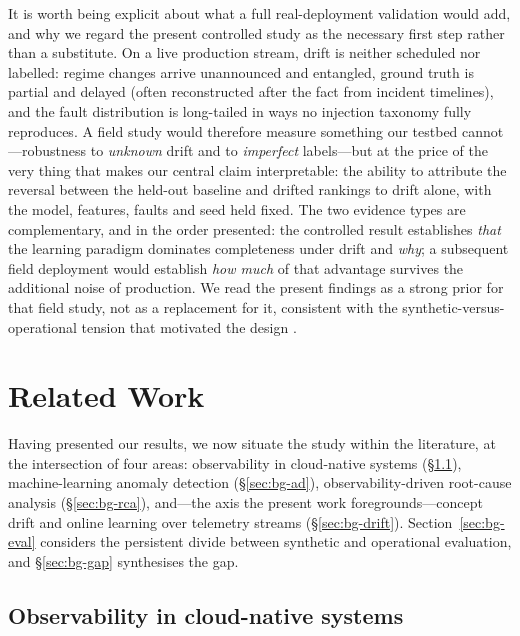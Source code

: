 \documentclass[pdflatex,sn-mathphys-num]{sn-jnl}%
\theoremstyle{thmstyleone}%
\theoremstyle{thmstyletwo}%
\theoremstyle{thmstylethree}%
\begin{document}
It is worth being explicit about what a full real-deployment validation would add, and why we regard the present controlled study as the necessary first step rather than a substitute. On a live production stream, drift is neither scheduled nor labelled: regime changes arrive unannounced and entangled, ground truth is partial and delayed (often reconstructed after the fact from incident timelines), and the fault distribution is long-tailed in ways no injection taxonomy fully reproduces. A field study would therefore measure something our testbed cannot---robustness to \emph{unknown} drift and to \emph{imperfect} labels---but at the price of the very thing that makes our central claim interpretable: the ability to attribute the reversal between the held-out baseline and drifted rankings to drift alone, with the model, features, faults and seed held fixed. The two evidence types are complementary, and in the order presented: the controlled result establishes \emph{that} the learning paradigm dominates completeness under drift and \emph{why}; a subsequent field deployment would establish \emph{how much} of that advantage survives the additional noise of production. We read the present findings as a strong prior for that field study, not as a replacement for it, consistent with the synthetic-versus-operational tension that motivated the design \cite{hrusto2026,islam2021}.

\section{Related Work}\label{sec:background}

Having presented our results, we now situate the study within the literature, at the intersection of four areas: observability in cloud-native systems (\S\ref{sec:bg-obs}), machine-learning anomaly detection (\S\ref{sec:bg-ad}), observability-driven root-cause analysis (\S\ref{sec:bg-rca}), and---the axis the present work foregrounds---concept drift and online learning over telemetry streams (\S\ref{sec:bg-drift}). Section~\ref{sec:bg-eval} considers the persistent divide between synthetic and operational evaluation, and \S\ref{sec:bg-gap} synthesises the gap.

\subsection{Observability in cloud-native systems}\label{sec:bg-obs}
\end{document}
